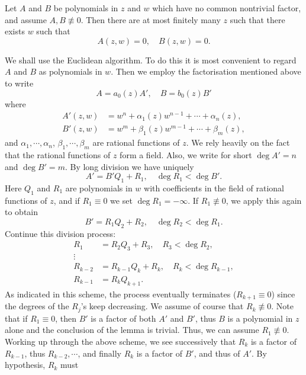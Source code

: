 \documentclass[a4paper,11pt]{article}
\begin{document}
\begin{lem}
  \label{lem:3}
  Let $A$ and $B$ be polynomials in $z$ and $w$ which have no common
  nontrivial factor, and assume $A, B \not\equiv 0$.  Then there are
  at most finitely many $z$ such that there exists $w$ such that
  $$
  A(z,w) = 0,\quad B(z,w) = 0.
  $$
\end{lem}

\begin{myproof}
  We shall use the Euclidean algorithm.  To do this it is most
  convenient to regard $A$ and $B$ as polynomials in $w$.  Then we
  employ the factorisation mentioned above to write
  $$
  A = a_0(z) A',\quad B = b_0(z) B'
  $$
  where
  $$
  \begin{aligned}
    A'(z,w) &= w^n + \alpha_1(z) w^{n-1} + \cdots + \alpha_n(z),\\
    B'(z,w) &= w^m + \beta_1(z) w^{m-1} + \cdots + \beta_m(z),
  \end{aligned}
  $$
  and $\alpha_1, \cdots, \alpha_n$, $\beta_1, \cdots, \beta_m$ are
  rational functions of $z$.  We rely heavily on the fact that the
  rational functions of $z$ form a field.  Also, we write for short
  $\deg A' = n$ and $\deg B' = m$.  By long division we have uniquely
  $$
  A' = B' Q_1 + R_1, \quad \deg R_1 < \deg B'.
  $$
  Here $Q_1$ and $R_1$ are polynomials in $w$ with coefficients in the
  field of rational functions of $z$, and if $R_1 \equiv 0$ we set
  $\deg R_1 = -\infty$.  If $R_1 \not\equiv 0$, we apply this again to
  obtain
  $$
  B' = R_1 Q_2 + R_2, \quad \deg R_2 < \deg R_1.
  $$
  Continue this division process:
  $$
  \begin{aligned}
    R_1 &= R_2 Q_3 + R_3, \quad R_3 < \deg R_2,\\
    \vdots &\\
    R_{k-2} &= R_{k-1} Q_k + R_k, \quad R_k < \deg R_{k-1},\\
    R_{k-1} &= R_k Q_{k+1}.
  \end{aligned}
  $$
  As indicated in this scheme, the process eventually terminates
  ($R_{k+1} \equiv 0$) since the degrees of the $R_j$'s keep
  decreasing.  We assume of course that $R_k \not\equiv 0$.  Note that
  if $R_1 \equiv 0$, then $B'$ is a factor of both $A'$ and $B'$, thus
  $B$ is a polynomial in $z$ alone and the conclusion of the lemma is
  trivial.  Thus, we can assume $R_1 \not\equiv 0$.  
  Working up through the above scheme, we see successively that $R_k$
  is a factor of $R_{k-1}$, thus $R_{k-2}, \cdots$, and finally $R_k$
  is a factor of $B'$, and thus of $A'$.  By hypothesis, $R_k$ must

\end{myproof}
\end{document}

